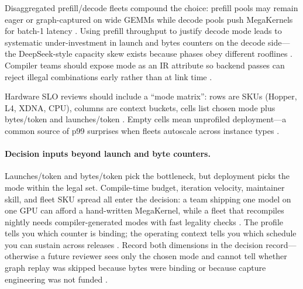 Disaggregated prefill/decode fleets compound the choice: prefill pools may remain eager or graph-captured on wide GEMMs while decode pools push MegaKernels for batch-1 latency \citep{patel2025llminference,liu2024deepseekv3,kwon2023vllm,taxbreak2026}. Using prefill throughput to justify decode mode leads to systematic under-investment in launch and bytes counters on the decode side---the DeepSeek-style capacity skew exists because phases obey different rooflines \citep{patel2025llminference,dao2023flashdecoding,memoryfloor2026,semianalysis2024tma,yirage2026,chen2020compilerbasedhardw,amd2024aie,amd2024xdna,nvidia2024cudagraphs,dlbook,liu2024deepseekv3,taxbreak2026,kwon2023vllm,dao2022flashattention}. Compiler teams should expose mode as an IR attribute so backend passes can reject illegal combinations early rather than at link time \citep{yirage2026,chen2020compilerbasedhardw,patel2025llminference,memoryfloor2026,taxbreak2026,nvidia2022hopper,semianalysis2024tma,nvidia2024cudagraphs,amd2024xdna,dlbook,dao2023flashdecoding,liu2024deepseekv3,kwon2023vllm,dao2022flashattention,amd2024aie}.

Hardware SLO reviews should include a ``mode matrix'': rows are SKUs (Hopper, L4, XDNA, CPU), columns are context buckets, cells list chosen mode plus bytes/token and launches/token \citep{memoryfloor2026,taxbreak2026,patel2025llminference,amd2024xdna,amd2024aie,semianalysis2024tma,yirage2026,chen2020compilerbasedhardw,nvidia2024cudagraphs,dao2022flashattention,kwon2023vllm,liu2024deepseekv3,dlbook,dao2023flashdecoding,nvidia2022hopper,taxbreak2026,memoryfloor2026,patel2025llminference}. Empty cells mean unprofiled deployment---a common source of p99 surprises when fleets autoscale across instance types \citep{patel2025llminference,kwon2023vllm,taxbreak2026,memoryfloor2026,yirage2026,chen2020compilerbasedhardw,amd2024xdna,amd2024aie,semianalysis2024tma,nvidia2024cudagraphs,dao2022flashattention,liu2024deepseekv3,dlbook,dao2023flashdecoding,nvidia2022hopper}.

\paragraph{Decision inputs beyond launch and byte counters.}
Launches/token and bytes/token pick the bottleneck, but deployment picks the mode within the legal set. Compile-time budget, iteration velocity, maintainer skill, and fleet SKU spread all enter the decision: a team shipping one model on one GPU can afford a hand-written MegaKernel, while a fleet that recompiles nightly needs compiler-generated modes with fast legality checks \citep{yirage2026,chen2020compilerbasedhardw,patel2025llminference}. The profile tells you which counter is binding; the operating context tells you which schedule you can sustain across releases \citep{taxbreak2026,memoryfloor2026}. Record both dimensions in the decision record---otherwise a future reviewer sees only the chosen mode and cannot tell whether graph replay was skipped because bytes were binding or because capture engineering was not funded \citep{kwon2023vllm,yirage2026}.

